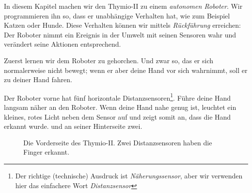 \label{ch.pet}

In diesem Kapitel machen wir den Thymio-II zu einem \emph{autonomen Roboter}.
Wir programmieren ihn so, dass er unabhängige Verhalten hat, wie zum Beispiel
Katzen oder Hunde. Diese Verhalten können wir mittels \textit{Rückführung}
erreichen: Der Roboter nimmt ein Ereignis in der Umwelt mit seinen Sensoren
wahr und verändert seine Aktionen entsprechend.


Zuerst lernen wir dem Roboter zu gehorchen. Und zwar so, das er sich
normalerweise nicht bewegt; wenn er aber deine Hand vor sich wahrnimmt, soll er
zu deiner Hand fahren.

Der Roboter vorne hat fünf horizontale Distanzsensoren\footnote{Der richtige
 (technische) Ausdruck ist \emph{Näherungssensor}, aber wir verwenden hier
 das einfachere Wort \emph{Distanzsensor}}. Führe deine Hand langsam näher an
 den Roboter. Wenn deine Hand nahe genug ist, leuchtet ein kleines, rotes
Licht neben dem Sensor auf und zeigt somit an, dass die Hand erkannt wurde.
und an seiner Hinterseite zwei. 

\begin{figure}
\begin{center}
\caption{Die Vorderseite des Thymio-II. Zwei Distanzsensoren haben die Finger
erkannt.}
\label{fig.detect}
\end{center}
\end{figure}

